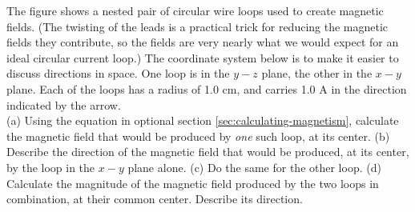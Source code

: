 The figure shows a nested pair of circular wire loops
used to create magnetic fields. (The twisting of the leads
is a practical trick for reducing the magnetic fields they
contribute, so the fields are very nearly what we would
expect for an ideal circular current loop.) The coordinate
system below is to make it easier to discuss directions in
space. One loop is in the $y-z$ plane, the other in the
$x-y$ plane. Each of the loops has a radius of
1.0 cm, and carries 1.0 A in the direction indicated by the arrow.\\
%
(a) Using the equation in optional section \ref{sec:calculating-magnetism}, calculate 
the magnetic field that would be produced by \emph{one} such
loop, at its center.\answercheck\hwendpart
%
(b) Describe the direction of the magnetic field that would
be produced, at its center, by the loop in the $x-y$ plane alone.\hwendpart
%
(c) Do the same for the other loop.\hwendpart
%
(d) Calculate the magnitude of the magnetic field produced 
by the two loops in combination, at their common center.
Describe its direction.\answercheck
